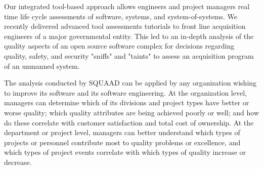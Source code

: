 
Our integrated tool-based approach allows engineers and project managers real time life cycle assessments of software, systems, and system-of-systems. We recently delivered advanced tool assessments tutorials to front line acquisition engineers of a major governmental entity. This led to an in-depth analysis of the quality aspects of an open source software complex for decisions regarding quality, safety, and security "sniffs" and "taints" to assess an acquisition program of an unmanned system.

The analysis conducted by SQUAAD can be applied by any organization wishing to improve its software and its software engineering. At the organization level, managers can determine which of its divisions and project types have better or worse quality; which quality attributes are being achieved poorly or well; and how do these correlate with customer satisfaction and total cost of ownership. At the department or project level, managers can better understand which types of projects or personnel contribute most to quality problems or excellence, and which types of project events correlate with which types of quality increase or decrease.